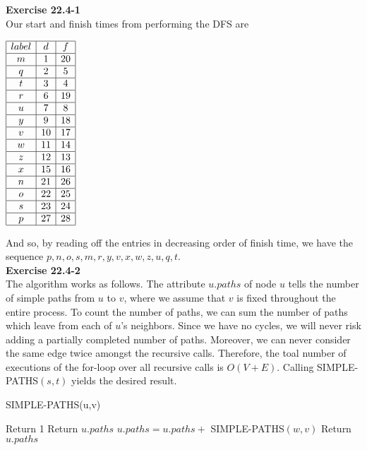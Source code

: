 \documentclass{article}
\begin{document}
\noindent\textbf{Exercise 22.4-1}\\

Our start and finish times from performing the DFS are

\begin{center}
$
\begin{array}{|c|c|c|}
\hline
label & d&f\\
\hline
m&1&20\\
\hline
q&2&5\\
\hline
t&3&4\\
\hline
r&6&19\\
\hline
u&7&8\\
\hline
y&9&18\\
\hline
v&10&17\\
\hline
w&11&14\\
\hline
z&12&13\\
\hline
x&15&16\\
\hline
n&21&26\\
\hline
o&22&25\\
\hline
s&23&24\\
\hline
p&27&28\\
\hline
\end{array}
$
\end{center}

And so, by reading off the entries in decreasing order of finish time, we have the sequence $p,n,o,s,m,r,y,v,x,w,z,u,q,t$.\\

\noindent\textbf{Exercise 22.4-2}\\

The algorithm works as follows.  The attribute $u.paths$ of node $u$ tells the number of simple paths from $u$ to $v$, where we assume that $v$ is fixed throughout the entire process.  To count the number of paths, we can sum the number of paths which leave from each of $u$'s neighbors.  Since we have no cycles, we will never risk adding a partially completed number of paths.   Moreover, we can never consider the same edge twice amongst the recursive calls.  Therefore, the toal number of executions of the for-loop over all recursive calls is $O(V + E)$.  Calling SIMPLE-PATHS$(s,t)$ yields the desired result. \\
\begin{algorithm}
\caption{SIMPLE-PATHS(u,v)}
\begin{algorithmic}[1]
	\State Return 1
	\State Return $u.paths$
\Else
		\State $u.paths = u.paths +$ SIMPLE-PATHS$(w,v)$
	\EndFor
	\State Return $u.paths$
\EndIf
\end{algorithmic}
\end{algorithm}
\end{document}
